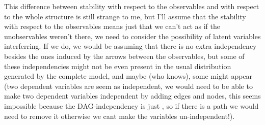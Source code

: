 This difference between stability with respect to the observables and with respect to the whole structure is still strange to me, but I'll assume that the stability with respect to the observables means just that we can't act as if the unobservables weren't there, we need to consider the possibility of latent variables interferring. If we do, we would be assuming that there is no extra independency besides the ones induced by the arrows between the observables, but some of these independencies might not be even present in the usual distribution generated by the complete model, and maybe (who knows), some might appear (two dependent variables are seem as independent, we would need to be able to make two dependent variables independent by adding edges and nodes, this seems impossible because the DAG-independency is just , so if there is a path we would need to remove it otherwise we cant make the variables un-independent!).
